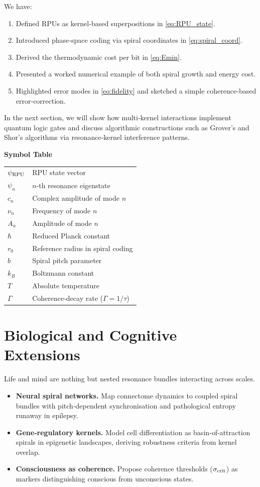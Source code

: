 We have:
\begin{enumerate}
  \item Defined RPUs as kernel‐based superpositions in \eqref{eq:RPU_state}.
  \item Introduced phase‐space coding via spiral coordinates in \eqref{eq:spiral_coord}.
  \item Derived the thermodynamic cost per bit in \eqref{eq:Emin}.
  \item Presented a worked numerical example of both spiral growth and energy cost.
  \item Highlighted error modes in \eqref{eq:fidelity} and sketched a simple coherence‐based error‐correction.
\end{enumerate}
In the next section, we will show how multi‐kernel interactions implement quantum logic gates and discuss algorithmic constructions such as Grover’s and Shor’s algorithms via resonance‐kernel interference patterns.

\medskip
\noindent\textbf{Symbol Table}
\begin{tabular}{ll}
  $\psi_{\rm RPU}$ & RPU state vector \\
  $\psi_{n}$ & $n$‐th resonance eigenstate \\
  $c_{n}$ & Complex amplitude of mode $n$ \\
  $\nu_{n}$ & Frequency of mode $n$ \\
  $A_{n}$ & Amplitude of mode $n$ \\
  $\hbar$ & Reduced Planck constant \\
  $r_{0}$ & Reference radius in spiral coding \\
  $b$ & Spiral pitch parameter \\
  $k_{B}$ & Boltzmann constant \\
  $T$ & Absolute temperature \\
  $\Gamma$ & Coherence‐decay rate ($\Gamma=1/\tau$)
\end{tabular}


\section{Biological and Cognitive Extensions}


\begin{concept}
Life and mind are nothing but nested resonance bundles interacting across scales.
\end{concept}

\begin{itemize}
  \item \textbf{Neural spiral networks.} Map connectome dynamics to coupled spiral bundles with pitch‐dependent synchronisation and pathological entropy runaway in epilepsy.
  \item \textbf{Gene‐regulatory kernels.} Model cell differentiation as basin‐of‐attraction spirals in epigenetic landscapes, deriving robustness criteria from kernel overlap.
  \item \textbf{Consciousness as coherence.} Propose coherence thresholds (\(\sigma_{\rm crit}\)) as markers distinguishing conscious from unconscious states.
\end{itemize}

